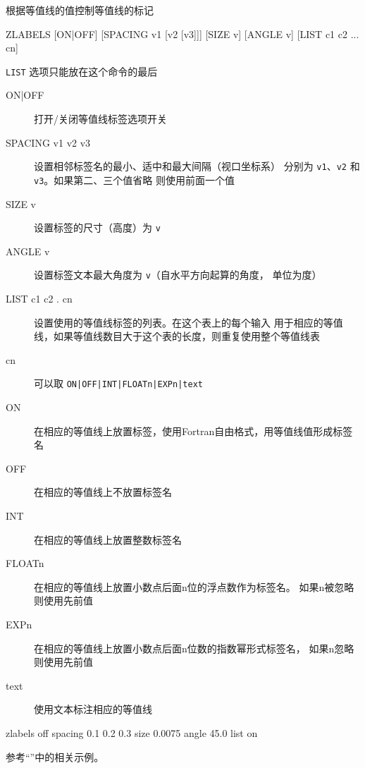 \label{cmd:zlabels}

根据等值线的值控制等值线的标记

\begin{SACSTX}
ZLABELS [ON|OFF] [SPACING v1 [v2 [v3]]] [SIZE v] [ANGLE v] [LIST c1 c2 ... cn]
\end{SACSTX}
\texttt{LIST} 选项只能放在这个命令的最后

\begin{description}
\item [ON|OFF] 打开/关闭等值线标签选项开关
\item [SPACING v1 v2 v3] 设置相邻标签名的最小、适中和最大间隔（视口坐标系）
    分别为 \texttt{v1}、\texttt{v2} 和 \texttt{v3}。如果第二、三个值省略
    则使用前面一个值
\item [SIZE v] 设置标签的尺寸（高度）为 \texttt{v}
\item [ANGLE v] 设置标签文本最大角度为 \texttt{v}（自水平方向起算的角度，
    单位为度）
\item [LIST c1 c2 . cn] 设置使用的等值线标签的列表。在这个表上的每个输入
    用于相应的等值线，如果等值线数目大于这个表的长度，则重复使用整个等值线表
\item [cn]  可以取 \texttt{ON|OFF|INT|FLOATn|EXPn|text}
\item [ON] 在相应的等值线上放置标签，使用Fortran自由格式，用等值线值形成标签名
\item [OFF] 在相应的等值线上不放置标签名
\item [INT] 在相应的等值线上放置整数标签名
\item [FLOATn] 在相应的等值线上放置小数点后面n位的浮点数作为标签名。
    如果n被忽略则使用先前值
\item [EXPn] 在相应的等值线上放置小数点后面n位数的指数幂形式标签名，
    如果n忽略则使用先前值
\item [text] 使用文本标注相应的等值线
\end{description}

\begin{SACDFT}
zlabels off spacing 0.1 0.2 0.3 size 0.0075 angle 45.0 list on
\end{SACDFT}

参考``''中的相关示例。
